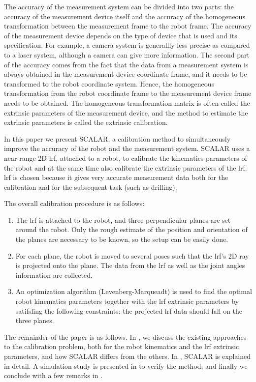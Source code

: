 The accuracy of the measurement system can be divided into two parts: the accuracy of the measurement device itself and the accuracy of the homogeneous transformation between the measurement frame to the robot frame. The accuracy of the measurement device depends on the type of device that is used and its specification. For example, a camera system is generallly less precise as compared to a laser system, although a camera can give more information. The second part of the accuracy comes from the fact that the data from a measurement system is always obtained in the measurement device coordinate frame, and it needs to be transformed to the robot coordinate system. Hence, the homogeneous transformation from the robot coordinate frame to the measurement device frame needs to be obtained. The homogeneous transformation matrix is often called the extrinsic parameters of the measurement device, and the method to estimate the extrinsic parameters is called the extrinsic calibration.  

In this paper we present SCALAR, a calibration method to simultaneously improve the accuracy of the robot and the measurement system. SCALAR uses a near-range 2D \ac{lrf}, attached to a robot, to calibrate the kinematics parameters of the robot and at the same time also calibrate the extrinsic parameters of the \ac{lrf}. \ac{lrf} is chosen because it gives very accurate measurement data both for the calibration and for the subsequent task (such as drilling).  

The overall calibration procedure is as follows:
\begin{enumerate}
\item The \ac{lrf} is attached to the robot, and three perpendicular planes are set around the robot. Only the rough estimate of the position and orientation of the planes are necessary to be known, so the setup can be easily done.
\item For each plane, the robot is moved to several poses such that the \ac{lrf}'s 2D ray is projected onto the plane. The data from the \ac{lrf} as well as the joint angles information are collected.
\item An optimization algorithm (Levenberg-Marqueadt) is used to find the optimal robot kinematics parameters together with the \ac{lrf} extrinsic parameters by satifsfing the following constraints: the projected \ac{lrf} data should fall on the three planes. 
\end{enumerate}

The remainder of the paper is as follows. In , we discuss the existing approaches to the calibration problem, both for the robot kinematics and the \ac{lrf} extrinsic parameters, and how SCALAR differs from the others. In , SCALAR is explained in detail. A simulation study is presented in  to verify the method, and finally we conclude with a few remarks in .  



